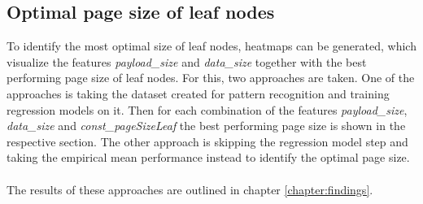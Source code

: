 \subsection{Optimal page size of leaf nodes}
To identify the most optimal size of leaf nodes, heatmaps can be generated, which visualize the features \textit{payload\_size} and \textit{data\_size} together with the best performing page size of leaf nodes. For this, two approaches are taken. One of the approaches is taking the dataset created for pattern recognition and training regression models on it. Then for each combination of the features \textit{payload\_size}, \textit{data\_size} and \textit{const\_pageSizeLeaf} the best performing page size is shown in the respective section. The other approach is skipping the regression model step and taking the empirical mean performance instead to identify the optimal page size. \\\\
The results of these approaches are outlined in chapter \ref{chapter:findings}. 